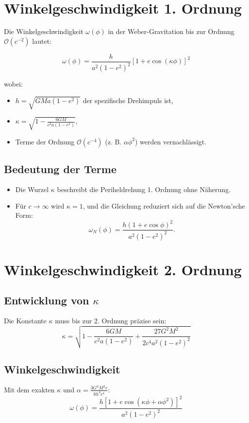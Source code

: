 \newpage
\section{Winkelgeschwindigkeit 1. Ordnung}
Die Winkelgeschwindigkeit \(\omega(\phi)\) in der Weber-Gravitation bis zur Ordnung \(\mathcal{O}(c^{-2})\) lautet:

\begin{equation}
\omega(\phi) = \frac{h}{a^2(1 - e^2)^2} \left[1 + e \cos\left(\kappa\phi\right)\right]^2
\end{equation}

wobei:
\begin{itemize}
    \item \(h = \sqrt{GMa(1 - e^2)}\) der spezifische Drehimpuls ist,
    \item \(\kappa = \sqrt{1 - \frac{6GM}{c^2a(1 - e^2)}}\),
    \item Terme der Ordnung \(\mathcal{O}(c^{-4})\) (z. B. \(\alpha\phi^2\)) werden vernachlässigt.
\end{itemize}

\subsection*{Bedeutung der Terme}
\begin{itemize}
    \item Die Wurzel \(\kappa\) beschreibt die Periheldrehung 1. Ordnung ohne Näherung.
    \item Für \(c \to \infty\) wird \(\kappa = 1\), und die Gleichung reduziert sich auf die Newton’sche Form:
    \[
    \omega_N(\phi) = \frac{h(1 + e \cos\phi)^2}{a^2(1 - e^2)^2}.
    \]
\end{itemize}

\section{Winkelgeschwindigkeit 2. Ordnung}

\subsection{Entwicklung von \(\kappa\)}
Die Konstante \(\kappa\) muss bis zur 2. Ordnung präzise sein:
\begin{equation}
\kappa = \sqrt{1 - \frac{6GM}{c^2a(1-e^2)} + \frac{27G^2M^2}{2c^4a^2(1-e^2)^2}}
\end{equation}

\subsection{Winkelgeschwindigkeit}
Mit dem exakten \(\kappa\) und \(\alpha = \frac{3G^2M^2e}{8h^4c^4}\):
\begin{equation}
\boxed
{
    \omega(\phi) = \frac{h[1 + e\cos(\kappa\phi + \alpha\phi^2)]^2}{a^2(1-e^2)^2}
}
\end{equation}
